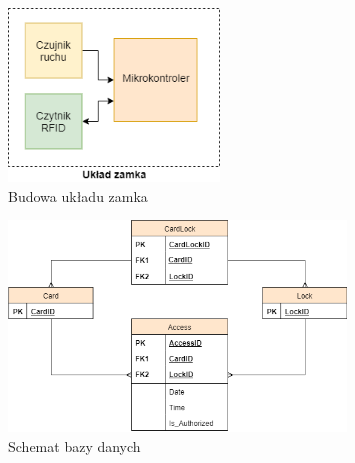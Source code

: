             \begin{figure}[]
                \centering
                \includegraphics[width=0.5\textwidth]{chapters/images/lock.png}
                \caption{Budowa układu zamka}
                \label{fig:lock-arch}
            \end{figure}
            \vspace{10mm}
            \begin{figure}[]
                \centering
                \includegraphics[width=0.8\textwidth]{chapters/images/schema.png}
                \caption{Schemat bazy danych}
                \label{fig:db}
            \end{figure}

